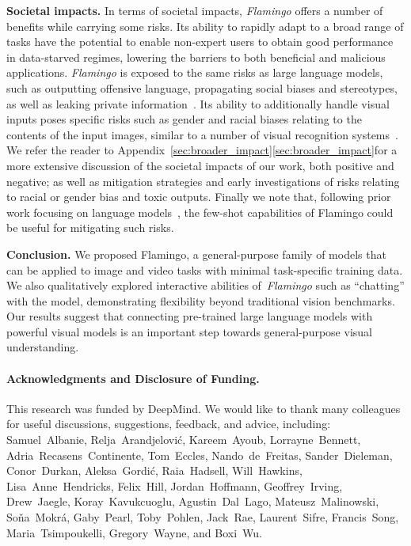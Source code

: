 \textbf{Societal impacts.} In terms of societal impacts, \emph{Flamingo} offers a number of benefits while carrying some risks. Its ability to rapidly adapt to a broad range of tasks have the potential to enable non-expert users to obtain good performance in data-starved regimes, lowering the barriers to both beneficial and malicious applications.
\emph{Flamingo} is exposed to the same risks as large language models, such as outputting offensive language, propagating social biases and stereotypes, as well as leaking private information~\citep{weidinger2021harms,chinchilla}. Its ability to additionally handle visual inputs poses specific risks such as gender and racial biases relating to the contents of the input images, similar to a number of visual recognition systems~\citep{hendricks2018women,zhao2021understanding,buolamwini2018gender,de2019does,schwemmer2020diagnosing}. We refer the reader to Appendix~\ifwithappendix\ref{sec:broader_impact}\else\ref*{sec:broader_impact}\fi for a more extensive discussion of the societal impacts of our work, both positive and negative; as well as mitigation strategies and early investigations of risks relating to racial or gender bias and toxic outputs. Finally we note that, following prior work focusing on language models~\citep{thoppilan2022lamda,perez2022red,menick2022teaching}, the few-shot capabilities of Flamingo could be useful for mitigating such risks.

\textbf{Conclusion.}
We proposed Flamingo, a general-purpose family of models that can be applied to image and video tasks with minimal task-specific training data. We also qualitatively explored interactive abilities of~\emph{Flamingo} such as ``chatting'' with the model, demonstrating flexibility beyond traditional vision benchmarks. Our results suggest that connecting pre-trained large language models with powerful visual models is an important step towards general-purpose visual understanding.

\paragraph{Acknowledgments and Disclosure of Funding.} This research was funded by DeepMind. We would like to thank many colleagues for useful discussions, suggestions, feedback, and advice, including: Samuel~Albanie, Relja~Arandjelović, Kareem~Ayoub, Lorrayne~Bennett, Adria~Recasens~Continente, Tom~Eccles, Nando~de~Freitas, Sander~Dieleman, Conor~Durkan, Aleksa~Gordić, Raia~Hadsell, Will~Hawkins, Lisa~Anne~Hendricks, Felix~Hill, Jordan~Hoffmann, Geoffrey~Irving, Drew~Jaegle, Koray~Kavukcuoglu, Agustin~Dal~Lago, Mateusz~Malinowski, Soňa~Mokrá, Gaby~Pearl, Toby~Pohlen, Jack~Rae, Laurent~Sifre, Francis~Song, Maria~Tsimpoukelli, Gregory~Wayne, and Boxi~Wu.


